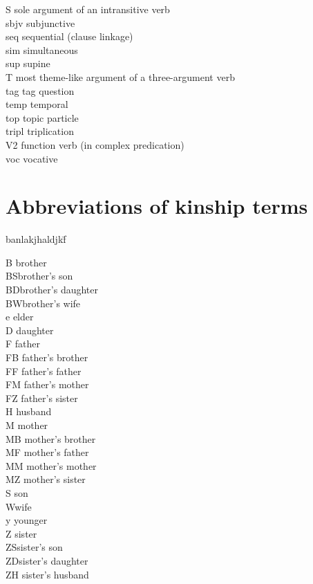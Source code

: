 {\begin{tabbing}
S 	\> sole argument of an intransitive verb\\
{\sc sbjv} \> subjunctive\\
{\sc seq}\> sequential (clause linkage)\\
{\sc sim} \> simultaneous\\
{\sc sup} \> supine\\
T \> most theme-like argument of a three-argument verb\\
{\sc tag} \> tag question\\
{\sc temp}\> temporal\\
{\sc top} \> topic particle\\
{\sc tripl}\> triplication\\
{\sc V2}\> function verb (in complex predication)\\
{\sc voc}\> vocative\\
\end{tabbing}
}



\section*{Abbreviations of kinship terms}

 {\small
\begin{tabbing}
banlakjhaldjkf\= \kill 

B\> brother\\
BS\>brother's son\\
BD\>brother's daughter\\
BW\>brother's wife\\
e\> elder\\
D\> daughter\\
F \> father\\
FB \> father's brother\\
FF \> father's father\\
FM \> father's mother\\
FZ \> father's sister\\
H\> husband\\
M \> mother\\
MB \> mother's brother\\
MF \> mother's father\\
MM \> mother's mother\\
MZ \> mother's sister\\
S \> son\\
W\>wife\\
y \> younger\\
Z \> sister\\
ZS\>sister's son\\
ZD\>sister's daughter\\
ZH\> sister's husband\\

\end{tabbing}
}





\mainmatter